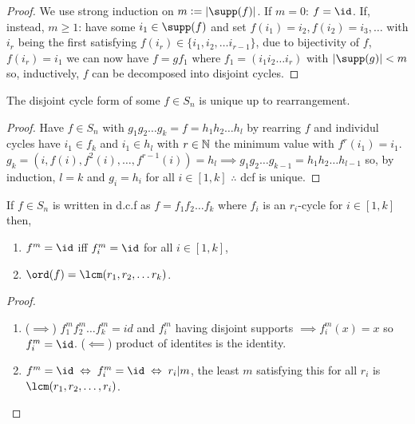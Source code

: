 \documentclass[../Year1/Year1.tex]{subfiles}
\begin{document}
\begin{proof}
    We use strong induction on $m:=|\supp(f)|$. If $m=0$: $f=\id$. If, instead, $m\geq1$: have some $i_1\in\supp(f)$ and set $f(i_1)=i_2,f(i_2)=i_3,\ldots$ with $i_r$ being the first satisfying $f(i_r)\in\{i_1,i_2,\ldots i_{r-1}\}$, due to bijectivity of $f$, $f(i_r)=i_1$ we can now have $f=gf_1$ where $f_1=(i_1i_2\ldots i_r)$ with $|\supp(g)|<m$ so, inductively, $f$ can be decomposed into disjoint cycles.
\end{proof}

\begin{theorem}
    The disjoint cycle form of some $f\in S_n$ is unique up to rearrangement.
\end{theorem}

\begin{proof}
    Have $f\in S_n$ with $g_1g_2\ldots g_k=f=h_1h_2\ldots h_l$ by rearring $f$ and individul cycles have $i_1\in f_k$ and $i_1\in h_l$ with $r\in\mathbb{N}$ the minimum value with $f^r(i_1)=i_1$. $g_k=(i,f(i),f^2(i),\ldots,f^{r-1}(i))=h_l \implies g_1g_2\ldots g_{k-1}=h_1h_2\ldots h_{l-1}$ so, by induction, $l=k$ and $g_i=h_i$ for all $i\in[1,k]$  $\therefore$ dcf is unique. 
\end{proof}

\begin{theorem}
    If $f\in S_n$ is written in d.c.f as $f=f_1f_2\ldots f_k$ where $f_i$ is an $r_i$-cycle for $i\in[1,k]$ then, \begin{enumerate}
        \item $f^m=\id$ iff $f_i^m=\id$ for all $i\in[1,k]$,
        \item $\ord(f) = \lcm(r_1,r_2,\ldots r_k)$.
    \end{enumerate}
\end{theorem}

\begin{proof}
    \begin{enumerate}
        \item ($\implies$) $f_1^m f_2^m\ldots f_k^m=id$ and $f_i^m$ having disjoint supports $\implies f_i^m(x)=x$ so $f_i^m=\id$. ($\impliedby$) product of identites is the identity.
        \item $f^m=\id\iff f_i^m=\id\iff r_i|m$, the least $m$ satisfying this for all $r_i$ is $\lcm(r_1,r_2,\ldots,r_i)$.\vspace{-10pt}
    \end{enumerate}
\end{proof}
\end{document}

